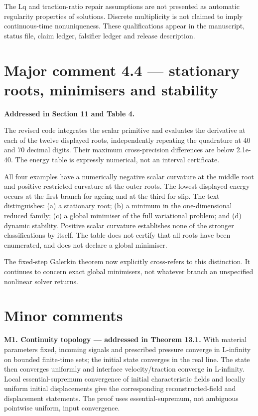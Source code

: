 \documentclass[11pt,a4paper]{article}
\begin{document}
The Lq and traction-ratio repair assumptions are not presented as automatic regularity properties of solutions. Discrete multiplicity is not claimed to imply continuous-time nonuniqueness. These qualifications appear in the manuscript, status file, claim ledger, falsifier ledger and release description.

\section*{Major comment 4.4 — stationary roots, minimisers and stability}
\textbf{Addressed in Section 11 and Table 4.}

The revised code integrates the scalar primitive and evaluates the derivative at each of the twelve displayed roots, independently repeating the quadrature at 40 and 70 decimal digits. Their maximum cross-precision differences are below 2.1e-40. The energy table is expressly numerical, not an interval certificate.

All four examples have a numerically negative scalar curvature at the middle root and positive restricted curvature at the outer roots. The lowest displayed energy occurs at the first branch for ageing and at the third for slip. The text distinguishes: (a) a stationary root; (b) a minimum in the one-dimensional reduced family; (c) a global minimiser of the full variational problem; and (d) dynamic stability. Positive scalar curvature establishes none of the stronger classifications by itself. The table does not certify that all roots have been enumerated, and does not declare a global minimiser.

The fixed-step Galerkin theorem now explicitly cross-refers to this distinction. It continues to concern exact global minimisers, not whatever branch an unspecified nonlinear solver returns.

\section*{Minor comments}

\textbf{M1. Continuity topology — addressed in Theorem 13.1.} With material parameters fixed, incoming signals and prescribed pressure converge in L-infinity on bounded finite-time sets; the initial state converges in the real line. The state then converges uniformly and interface velocity/traction converge in L-infinity. Local essential-supremum convergence of initial characteristic fields and locally uniform initial displacements give the corresponding reconstructed-field and displacement statements. The proof uses essential-supremum, not ambiguous pointwise uniform, input convergence.
\end{document}
